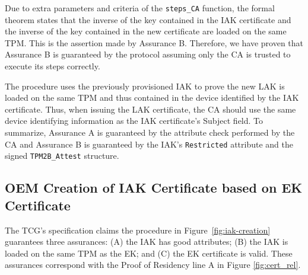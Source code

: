 \documentclass[runningheads]{llncs}
\begin{document}
Due to extra parameters and criteria of the \verb|steps_CA| function,
the formal theorem states that the inverse of the key contained in the
IAK certificate and the inverse of the key contained in the new
certificate are loaded on the same TPM. This is the assertion made by
Assurance B.  Therefore, we have proven that Assurance B is guaranteed
by the protocol assuming only the CA is trusted to execute its steps
correctly.

The procedure uses the previously provisioned IAK to prove the new LAK
is loaded on the same TPM and thus contained in the device identified
by the IAK certificate. Thus, when issuing the LAK certificate, the CA
should use the same device identifying information as the IAK
certificate's Subject field. To summarize, Assurance A is guaranteed
by the attribute check performed by the CA and Assurance B is
guaranteed by the IAK's \verb|Restricted| attribute and the signed
\verb|TPM2B_Attest| structure.

\subsection{OEM Creation of IAK Certificate based on EK Certificate}

The TCG's specification claims the procedure in
Figure~\ref{fig:iak-creation} guarantees three assurances: (A) the IAK
has good attributes; (B) the IAK is loaded on the same TPM as the EK;
and (C) the EK certificate is valid. These assurances correspond with
the Proof of Residency line A in Figure \ref{fig:cert_rel}.
\end{document}
